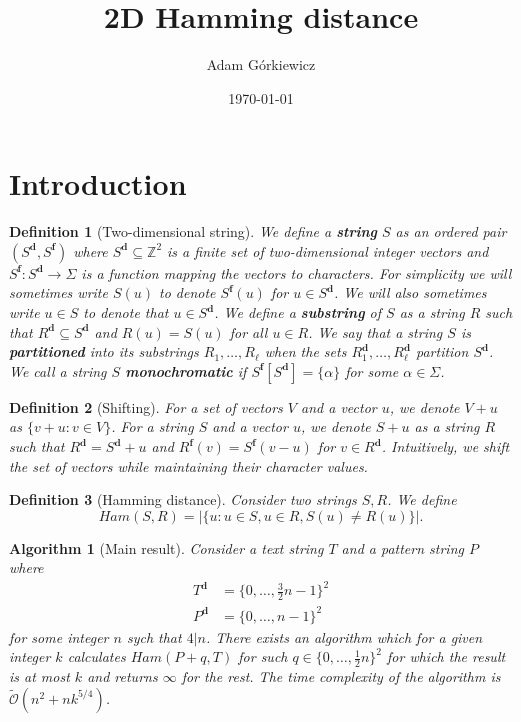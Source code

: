 \documentclass[a4paper]{article}
\date{\today}
\author{Adam Górkiewicz}
\title{2D Hamming distance}
\newcommand{\Z}{\mathbb{Z}}
\newcommand{\tO}{\tilde{\mathcal{O}}}
\newcommand{\set}[1]{\lbrace #1 \rbrace}
\newcommand{\eq}[1]{\begin{align*} #1 \end{align*}}
\newtheorem{definition}{Definition}
\newtheorem{algorithm}{Algorithm}
\begin{document}
\section{Introduction}


\renewcommand{\d}[1]{#1^\mathbf{d}}
\newcommand{\f}[1]{#1^\mathbf{f}}
\begin{definition}[Two-dimensional string]
	We define a \textbf{string} $S$ as an ordered pair $(\d{S}, \f{S})$ where $\d{S} \subseteq \Z^2$ is a finite set of two-dimensional integer vectors and $\f{S} : \d{S} \to \Sigma$
	is a function mapping the vectors to characters.
	For simplicity we will sometimes write $S(u)$ to denote $\f{S}(u)$ for $u \in \d{S}$.
	We will also sometimes write $u \in S$ to denote that $u \in \d{S}$.
	We define a \textbf{substring} of $S$ as a string $R$ such that $\d{R} \subseteq \d{S}$ and $R(u) = S(u)$ for all $u \in R$.
	We say that a string $S$ is \textbf{partitioned} into its substrings $R_1, \dots, R_\ell$ when the sets $\d{R_1}, \dots, \d{R_\ell}$ partition $\d{S}$.
	We call a string $S$ \textbf{monochromatic} if $\f{S}[\d{S}] = \set{\alpha}$ for some $\alpha \in \Sigma$.
\end{definition}




\begin{definition}[Shifting]
	For a set of vectors $V$ and a vector $u$, we denote $V + u$ as $\set{v + u : v \in V}$.
	For a string $S$ and a vector $u$, we denote $S + u$ as a string $R$ such that
	$\d{R} = \d{S} + u$ and $\f{R}(v) = \f{S}(v - u)$ for $v \in \d{R}$.
	Intuitively, we shift the set of vectors while maintaining their character values.
\end{definition}


\begin{definition}[Hamming distance]
	Consider two strings $S, R$. We define
	$$ Ham(S, R) = |\set{u : u \in S, u \in R, S(u) \neq R(u)}|.$$
\end{definition}


\begin{algorithm}[Main result]
	\label{main_algo}
	Consider a text string $T$ and a pattern string $P$ where
	\eq{
		\d{T} &= \set{0, \dots, \frac{3}{2}n - 1}^2 \\
		\d{P} &= \set{0, \dots, n - 1}^2
	}
	for some integer $n$ sych that $4|n$.
	There exists an algorithm which for a given integer $k$ calculates
	$ Ham(P + q, T) $
	for such $q \in \set{0, \dots, \frac{1}{2}n}^2$ for which the result is at most $k$ and returns $\infty$ for the rest.
	The time complexity of the algorithm is $\tO(n^2 + nk^{5/4})$.
\end{algorithm}
\end{document}
